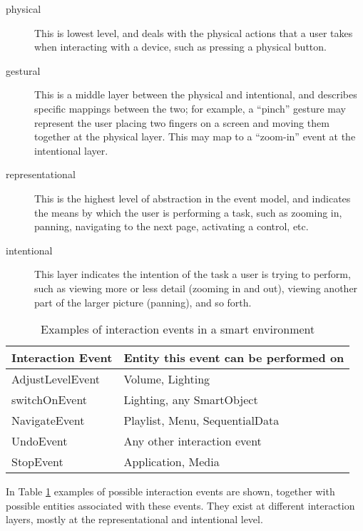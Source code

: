 \begin{description}
\item [physical] This is lowest level, and deals with the physical actions that a user takes when interacting with a device, such as pressing a physical button.
\item [gestural] This is a middle layer between the physical and intentional, and describes specific mappings between the two; for example, a ``pinch'' gesture may represent the user placing two fingers on a screen and moving them together at the physical layer. This may map to a ``zoom-in'' event at the intentional layer.
\item [representational] This is the highest level of abstraction in the event model, and indicates the means by which the user is performing a task, such as zooming in, panning, navigating to the next page, activating a control, etc.
\item [intentional] This layer indicates the intention of the task a user is trying to perform, such as viewing more or less detail (zooming in and out), viewing another part of the larger picture (panning), and so forth.
\end{description}

\begin{table}
\centering
\begin{tabular}{|l|l|}
\hline
Interaction Event & Entity this event can be performed on\\
\hline
AdjustLevelEvent & Volume, Lighting \\
switchOnEvent & Lighting, any SmartObject \\
NavigateEvent & Playlist, Menu, SequentialData \\
UndoEvent & Any other interaction event \\
StopEvent & Application, Media \\
\hline
\end{tabular}
\caption{Examples of interaction events in a smart environment}
\label{transformationTable}
\end{table}

In Table \ref{transformationTable} examples of possible interaction events are shown, together with possible entities associated with these events. They exist at different interaction layers, mostly at the representational and intentional level.



